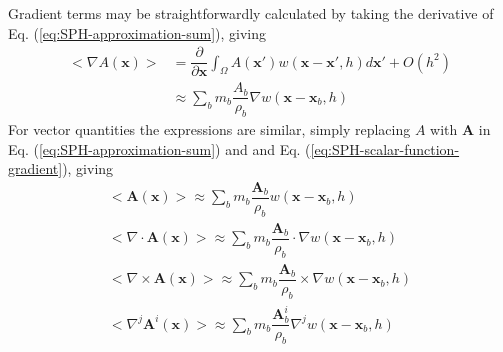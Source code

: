\documentclass[journal abbreviation, manuscript]{copernicus}
\begin{document}
Gradient terms may be straightforwardly calculated by taking the derivative of Eq. (\ref{eq:SPH-approximation-sum}), giving
\begin{equation}
\begin{split}
<\nabla A(\textbf{x})> & = \dfrac{\partial }{\partial \textbf{x}} \int_{\Omega} A(\textbf{x} \prime) w(\textbf{x}-\textbf{x}\prime, h) d\textbf{x}\prime + O(h^2) \\
& \approx \sum_b m_b \dfrac{A_b}{\rho_b} \nabla w(\textbf{x} - \textbf{x}_b, h)
\end{split} 
\label{eq:SPH-scalar-function-gradient}
\end{equation}
For vector quantities the expressions are similar, simply replacing $A$ with $\textbf{A}$ in Eq. (\ref{eq:SPH-approximation-sum}) and and Eq. (\ref{eq:SPH-scalar-function-gradient}), giving
\begin{align}
<\textbf{A}(\textbf{x})> \approx \sum_b m_b \dfrac{\textbf{A}_b}{\rho_b} w(\textbf{x}-\textbf{x}_b, h) \\
<\nabla \cdot \textbf{A}(\textbf{x})> \approx \sum_b m_b \dfrac{\textbf{A}_b}{\rho_b} \cdot \nabla w(\textbf{x} - \textbf{x}_b, h) \\
<\nabla \times \textbf{A}(\textbf{x})> \approx \sum_b m_b \dfrac{\textbf{A}_b}{\rho_b} \times \nabla w(\textbf{x} - \textbf{x}_b, h) \\
<\nabla^j \textbf{A}^i(\textbf{x})> \approx \sum_b m_b \dfrac{\textbf{A}_b^i}{\rho_b} \nabla^j w(\textbf{x} - \textbf{x}_b, h) 
\label{eq:SPH-vecctor-function}
\end{align}
%
\end{document}
